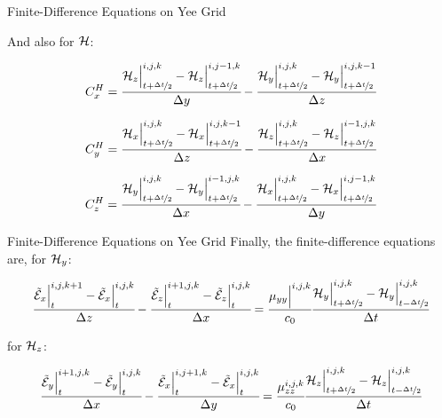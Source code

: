 \documentclass{beamer}
\begin{document}
\begin{frame}{Finite-Difference Equations on Yee Grid}
  
  And also for $\mathcal{H}$:

  \begin{align}
      C_x^H = \cfrac{\mathcal{H}_z\Big|^{i,j,k}_{t+\nicefrac{\Delta t}{2}}-\mathcal{H}_z\Big|^{i,j-1,k}_{t+\nicefrac{\Delta t}{2}}}{\Delta y} - \cfrac{\mathcal{H}_y\Big|^{i,j,k}_{t+\nicefrac{\Delta t}{2}}-\mathcal{H}_y\Big|^{i,j,k-1}_{t+\nicefrac{\Delta t}{2}}}{\Delta z}
      \label{eq:CHx}
  \end{align}
  
  
  \begin{align}
      C_y^H = \cfrac{\mathcal{H}_x\Big|^{i,j,k}_{t+\nicefrac{\Delta t}{2}}-\mathcal{H}_x\Big|^{i,j,k-1}_{t+\nicefrac{\Delta t}{2}}}{\Delta z} - \cfrac{\mathcal{H}_z\Big|^{i,j,k}_{t+\nicefrac{\Delta t}{2}}-\mathcal{H}_z\Big|^{i-1,j,k}_{t+\nicefrac{\Delta t}{2}}}{\Delta x}
      \label{eq:CHy}
  \end{align}
  
  
  \begin{align}
      C_z^H = \cfrac{\mathcal{H}_y\Big|^{i,j,k}_{t+\nicefrac{\Delta t}{2}}-\mathcal{H}_y\Big|^{i-1,j,k}_{t+\nicefrac{\Delta t}{2}}}{\Delta x} - \cfrac{\mathcal{H}_x\Big|^{i,j,k}_{t+\nicefrac{\Delta t}{2}}-\mathcal{H}_x\Big|^{i,j-1,k}_{t+\nicefrac{\Delta t}{2}}}{\Delta y}
      \label{eq:CHz}
  \end{align}

\end{frame}

\begin{frame}{Finite-Difference Equations on Yee Grid}
  Finally, the finite-difference equations are, for $\mathcal{H}_y$:

\begin{align}
    \cfrac{\tilde{\mathcal{E}}_x\Big|^{i,j,k+1}_{t}-\tilde{\mathcal{E}}_x\Big|^{i,j,k}_{t}}{\Delta z} - \cfrac{\tilde{\mathcal{E}}_z\Big|^{i+1,j,k}_{t}-\tilde{\mathcal{E}}_z\Big|^{i,j,k}_{t}}{\Delta x}=\cfrac{\mu_{yy}\Big|^{i,j,k}}{c_0}\cfrac{\mathcal{H}_y\Big|^{i,j,k}_{t+\nicefrac{\Delta t}{2}} - \mathcal{H}_y\Big|^{i,j,k}_{t-\nicefrac{\Delta t}{2}}}{\Delta t}
    \label{eq:fd_hy}
\end{align}

for $\mathcal{H}_z$:

\begin{align}
    \cfrac{\tilde{\mathcal{E}}_y\Big|^{i+1,j,k}_{t}-\tilde{\mathcal{E}}_y\Big|^{i,j,k}_{t}}{\Delta x} - \cfrac{\tilde{\mathcal{E}}_x\Big|^{i,j+1,k}_{t}-\tilde{\mathcal{E}}_x\Big|^{i,j,k}_{t}}{\Delta y} = \cfrac{\mu_{zz}^{i,j,k}}{c_0}\cfrac{\mathcal{H}_z\Big|^{i,j,k}_{t+\nicefrac{\Delta t}{2}} - \mathcal{H}_z\Big|^{i,j,k}_{t-\nicefrac{\Delta t}{2}}}{\Delta t}
    \label{eq:fd_hz}
\end{align}



\end{frame}
\end{document}
